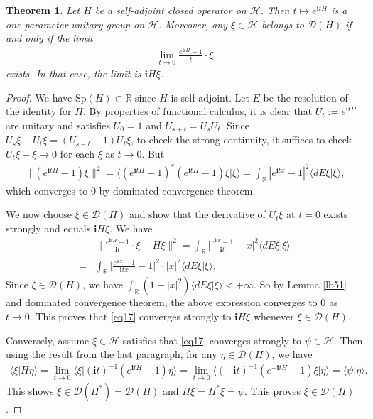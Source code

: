 \documentclass[12pt,b5paper,notitlepage]{article}
\theoremstyle{definition}
\theoremstyle{plain}
\newtheorem{thm}[df]{Theorem}
\newcommand{\mc}{\mathcal}
\newcommand{\Dom}{\scr D}
\newcommand{\bk}[1]{\langle {#1}\rangle}
\newcommand{\scr}{\mathscr}
\newcommand{\im}{\mathbf{i}}
\newcommand{\Rbb}{\mathbb R}
\newcommand{\Sp}{\mathrm{Sp}}
\numberwithin{equation}{section}
\begin{document}
\begin{thm}\label{lb103}
Let $H$ be a self-adjoint closed operator on $\mc H$. Then $t\mapsto e^{\im tH}$ is a one parameter unitary group on $\mc H$. Moreover, any $\xi\in\mc H$ belongs to $\Dom(H)$ if and only if the limit
\begin{align}
\lim_{t\rightarrow 0}\frac{e^{\im tH}-1}{t}\cdot \xi\label{eq17}	
\end{align}
exists. In that case, the limit is $\im H\xi$.
\end{thm}


\begin{proof}
We have $\Sp(H)\subset\Rbb$ since $H$ is self-adjoint. Let $E$ be the resolution of the identity for $H$. By properties of functional calculus, it is clear that $U_t:=e^{\im tH}$ are unitary and satisfies $U_0=1$ and $U_{s+t}=U_sU_t$. Since $U_s\xi-U_t\xi=(U_{s-t}-1)U_t\xi$, to check the strong continuity, it suffices to check $U_t\xi-\xi\rightarrow 0$ for each $\xi$ as $t\rightarrow 0$. But
\begin{align*}
\lVert (e^{\im tH}-1)\xi\lVert^2=\bk{(e^{\im tH}-1)^*(e^{\im tH}-1)\xi|\xi}=\int_\Rbb |e^{\im tx}-1|^2\bk{dE\xi|\xi},
\end{align*}
which converges to $0$ by dominated convergence theorem.

We now choose $\xi\in\Dom(H)$ and show that the derivative of $U_t\xi$ at $t=0$ exists strongly and equals $\im H\xi$. We have
\begin{align}
&\Big\lVert \frac{e^{\im tH}-1}{\im t}\cdot \xi-H\xi  \Big\lVert^2=\int_\Rbb \Big|\frac{e^{\im tx}-1}{\im t}-x  \Big|^2\bk{dE\xi|\xi}\nonumber\\
=&	\int_\Rbb \Big|\frac{e^{\im tx}-1}{\im tx}-1  \Big|^2\cdot |x|^2\bk{dE\xi|\xi},\nonumber
\end{align}
Since $\xi\in\Dom(H)$, we have $\int_\Rbb (1+|x|^2)\bk{dE\xi|\xi}<+\infty$. So by Lemma \ref{lb51} and dominated convergence theorem, the above expression converges to $0$ as $t\rightarrow 0$. This proves that \eqref{eq17} converges strongly to $\im H\xi$ whenever $\xi\in\Dom(H)$.

Conversely, assume $\xi\in\mc H$ satisfies that \eqref{eq17} converges strongly to $\psi\in\mc H$. Then using the result from the last paragraph, for any $\eta\in\Dom(H)$, we have
\begin{align}
\bk{\xi|H\eta}=\lim_{t\rightarrow 0}\bk{\xi|(\im t)^{-1}(e^{\im tH}-1)\eta}=\lim_{t\rightarrow 0}\bk{(-\im t)^{-1}(e^{-\im tH}-1)\xi|\eta}=\bk{\psi|\eta}.	\label{eq18}
\end{align}
This shows $\xi\in\Dom(H^*)=\Dom(H)$ and $H\xi=H^*\xi=\psi$. This proves $\xi\in\Dom(H)$.
\end{proof}
\end{document}
